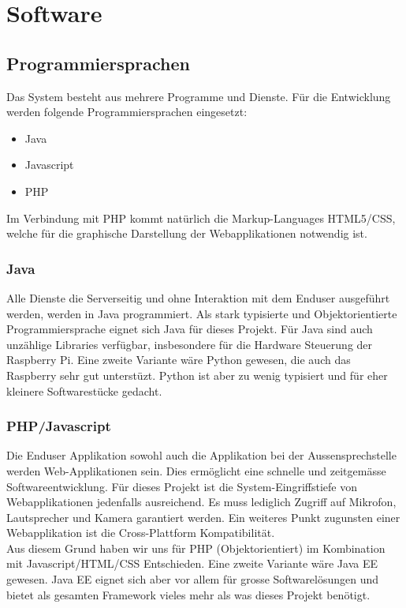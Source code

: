 \section{Software}
\label{sec:chapterexample}

\subsection{Programmiersprachen}
Das System besteht aus mehrere Programme und Dienste. Für die Entwicklung werden folgende Programmiersprachen eingesetzt:
\begin{itemize}
	\item Java
	\item Javascript
	\item PHP
\end{itemize}
Im Verbindung mit PHP kommt natürlich die Markup-Languages HTML5/CSS, welche für die graphische Darstellung der Webapplikationen notwendig ist.

\subsubsection{Java}
\label{kap:java}
Alle Dienste die Serverseitig und ohne Interaktion mit dem Enduser ausgeführt werden, werden in Java programmiert. Als stark typisierte und Objektorientierte Programmiersprache eignet sich Java für dieses Projekt. Für Java sind auch unzählige Libraries verfügbar, insbesondere für die Hardware Steuerung der Raspberry Pi. Eine zweite Variante wäre Python gewesen, die auch das Raspberry sehr gut unterstüzt. Python ist aber zu wenig typisiert und für eher kleinere Softwarestücke gedacht.

\subsubsection{PHP/Javascript}
Die Enduser Applikation sowohl auch die Applikation bei der Aussensprechstelle werden Web-Applikationen sein. Dies ermöglicht eine schnelle und zeitgemässe Softwareentwicklung. Für dieses Projekt ist die System-Eingriffstiefe von Webapplikationen jedenfalls ausreichend. Es muss lediglich Zugriff auf Mikrofon, Lautsprecher und Kamera garantiert werden. Ein weiteres Punkt zugunsten einer Webapplikation ist die Cross-Plattform Kompatibilität. 
\\
Aus diesem Grund haben wir uns für PHP (Objektorientiert) im Kombination mit Javascript/HTML/CSS Entschieden. Eine zweite Variante wäre Java EE gewesen. Java EE eignet sich aber vor allem für grosse Softwarelösungen und bietet als gesamten Framework vieles mehr als was dieses Projekt benötigt. 
\\
